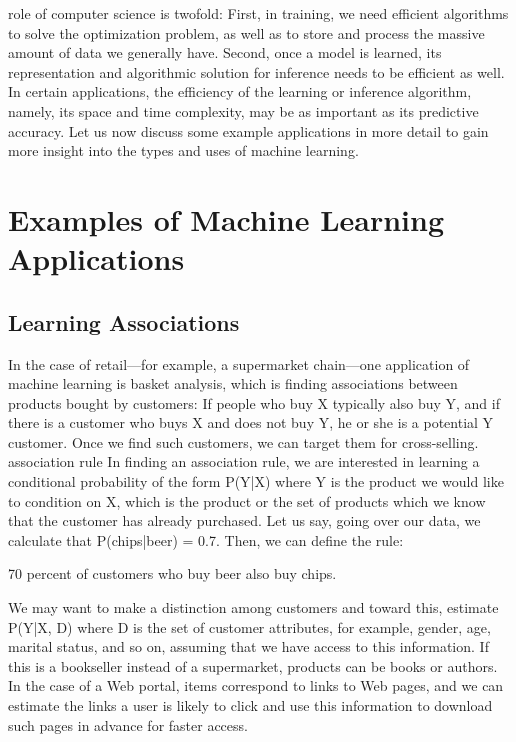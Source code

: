 role of computer science is twofold: First, in training, we need efficient algorithms to solve the optimization problem, as well as to store and process the massive amount of data we generally have. Second, once a model is learned, its representation and algorithmic solution for inference needs to be efficient as well. In certain applications, the efficiency of the learning or inference algorithm, namely, its space and time complexity, may be as important as its predictive accuracy. Let us now discuss some example applications in more detail to gain more insight into the types and uses of machine learning.

\section{Examples of Machine Learning Applications}

\subsection{Learning Associations}

In the case of retail---for example, a supermarket chain---one application of machine learning is basket analysis, which is finding associations between products bought by customers: If people who buy X typically also buy Y, and if there is a customer who buys X and does not buy Y, he or she is a potential Y customer. Once we find such customers, we can target them for cross-selling. association rule In finding an association rule, we are interested in learning a conditional probability of the form P(Y|X) where Y is the product we would like to condition on X, which is the product or the set of products which we know that the customer has already purchased. Let us say, going over our data, we calculate that P(chips|beer) = 0.7. Then, we can define the rule:

70 percent of customers who buy beer also buy chips.

We may want to make a distinction among customers and toward this, estimate P(Y|X, D) where D is the set of customer attributes, for example, gender, age, marital status, and so on, assuming that we have access to this information. If this is a bookseller instead of a supermarket, products can be books or authors. In the case of a Web portal, items correspond to links to Web pages, and we can estimate the links a user is likely to click and use this information to download such pages in advance for faster access.


